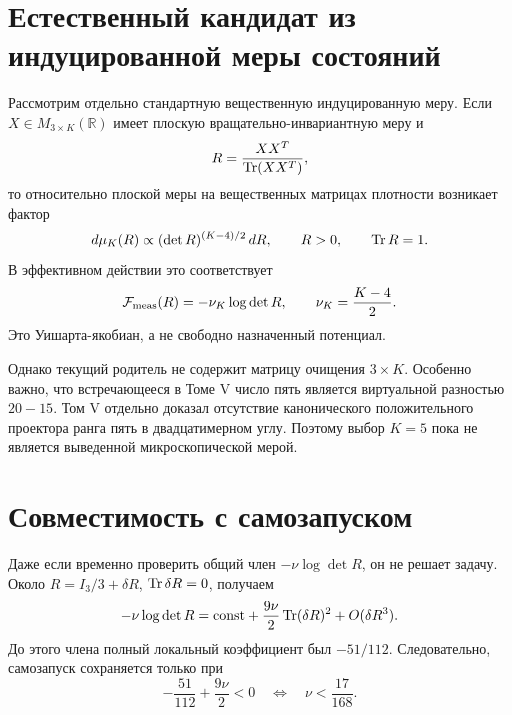 \section{Естественный кандидат из индуцированной меры состояний}

Рассмотрим отдельно стандартную вещественную индуцированную меру. Если
$X\in M_{3\times K}(\mathbb R)$ имеет плоскую вращательно-инвариантную
меру и
\begin{equation}
 R=\frac{XX^T}{\operatorname{Tr}(XX^T)},
\end{equation}
то относительно плоской меры на вещественных матрицах плотности возникает
фактор
\begin{equation}
 d\mu_K(R)\propto
 (\det R)^{(K-4)/2}\,dR,
 \qquad R>0,\qquad\operatorname{Tr} R=1.
 \label{eq:v6-real-induced-state-measure}
\end{equation}
В эффективном действии это соответствует
\begin{equation}
 \mathcal F_{\rm meas}(R)=-\nu_K\log\det R,
 \qquad \nu_K=\frac{K-4}{2}.
 \label{eq:v6-induced-logdet-barrier}
\end{equation}
Это Уишарта-якобиан, а не свободно назначенный потенциал.

Однако текущий родитель не содержит матрицу очищения $3\times K$. Особенно
важно, что встречающееся в Томе V число пять является виртуальной разностью
$20-15$. Том V отдельно доказал отсутствие канонического положительного
проектора ранга пять в двадцатимерном углу. Поэтому выбор $K=5$ пока не
является выведенной микроскопической мерой.

\section{Совместимость с самозапуском}

Даже если временно проверить общий член
$-\nu\log\det R$, он не решает задачу. Около
$R=I_3/3+\delta R$, $\operatorname{Tr}\delta R=0$, получаем
\begin{equation}
 -\nu\log\det R
 =\mathrm{const}+\frac{9\nu}{2}\operatorname{Tr}(\delta R)^2+O(\delta R^3).
\end{equation}
До этого члена полный локальный коэффициент был $-51/112$. Следовательно,
самозапуск сохраняется только при
\begin{equation}
 -\frac{51}{112}+\frac{9\nu}{2}<0
 \quad\Longleftrightarrow\quad
 \nu<\frac{17}{168}.
 \label{eq:v6-logdet-instability-upper-bound}
\end{equation}

